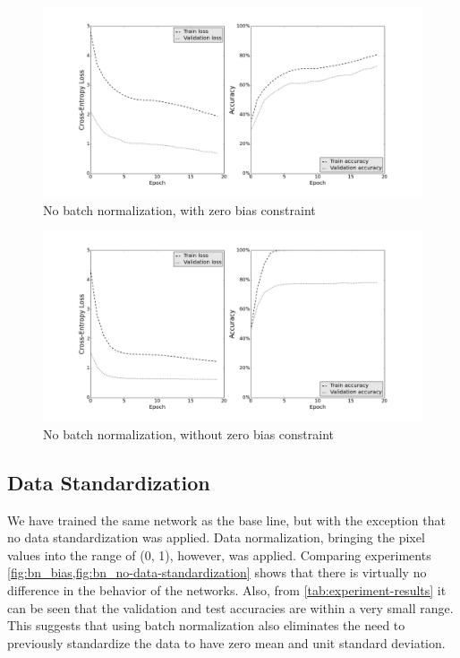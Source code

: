 \documentclass[a4paper, 11pt]{article}
\begin{document}
\begin{figure}[H]
	\includegraphics[width=\linewidth]{no-bn_bias-constraint.png}
	\caption{No batch normalization, with zero bias constraint}
	\label{fig:no-bn_bias}
\end{figure}

\begin{figure}[H]
	\includegraphics[width=\linewidth]{no-bn_no-bias-constraint.png}
	\caption{No batch normalization, without zero bias constraint}
	\label{fig:no-bn_no-bias}
\end{figure}

\clearpage

\subsection{Data Standardization}

We have trained the same network as the base line, but with the exception that no data standardization was applied.
Data normalization, bringing the pixel values into the range of (0, 1), however, was applied.
Comparing experiments \cref{fig:bn_bias,fig:bn_no-data-standardization} shows that there is virtually no difference in the behavior of the networks.
Also, from \cref{tab:experiment-results} it can be seen that the validation and test accuracies are within a very small range.
This suggests that using batch normalization also eliminates the need to previously standardize the data to have zero mean and unit standard deviation.
\end{document}
